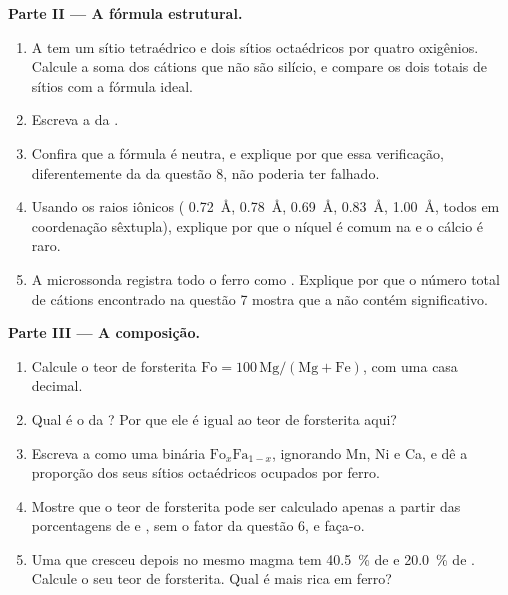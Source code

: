 \begin{problem}
\medskip
\noindent\textbf{Parte II --- A fórmula estrutural.}
\begin{enumerate}[resume]
  \item A  tem um sítio tetraédrico e dois sítios octaédricos por quatro oxigênios. Calcule a soma dos cátions que não são silício, e compare os dois totais de sítios com a fórmula ideal.
  \item Escreva a  da .
  \item Confira que a fórmula é neutra, e explique por que essa verificação, diferentemente da da questão 8, não poderia ter falhado.
  \item Usando os raios iônicos ( \qty{0.72}{\angstrom},  \qty{0.78}{\angstrom}, 
        \qty{0.69}{\angstrom},  \qty{0.83}{\angstrom},
         \qty{1.00}{\angstrom}, todos em coordenação sêxtupla), explique por que o níquel é comum na  e o cálcio é raro.
  \item A microssonda registra todo o ferro como . Explique por que o número total de cátions encontrado na questão 7 mostra que a  não contém  significativo.
\end{enumerate}

\medskip
\noindent\textbf{Parte III --- A composição.}
\begin{enumerate}[resume]
  \item Calcule o teor de forsterita $\mathrm{Fo} = 100\,\mathrm{Mg}/(\mathrm{Mg} +
        \mathrm{Fe})$, com uma casa decimal.
  \item Qual é o  da ? Por que ele é igual ao teor de forsterita aqui?
  \item Escreva a  como uma  binária
        $\mathrm{Fo}_x\mathrm{Fa}_{1-x}$, ignorando Mn, Ni e Ca, e dê a proporção dos seus sítios octaédricos ocupados por ferro.
  \item Mostre que o teor de forsterita pode ser calculado apenas a partir das porcentagens de  e , sem o fator da questão 6, e faça-o.
  \item Uma  que cresceu depois no mesmo magma tem \qty{40.5}{\percent}
        de  e \qty{20.0}{\percent} de . Calcule o seu teor de forsterita. Qual  é mais rica em ferro?
\end{enumerate}


\end{problem}
